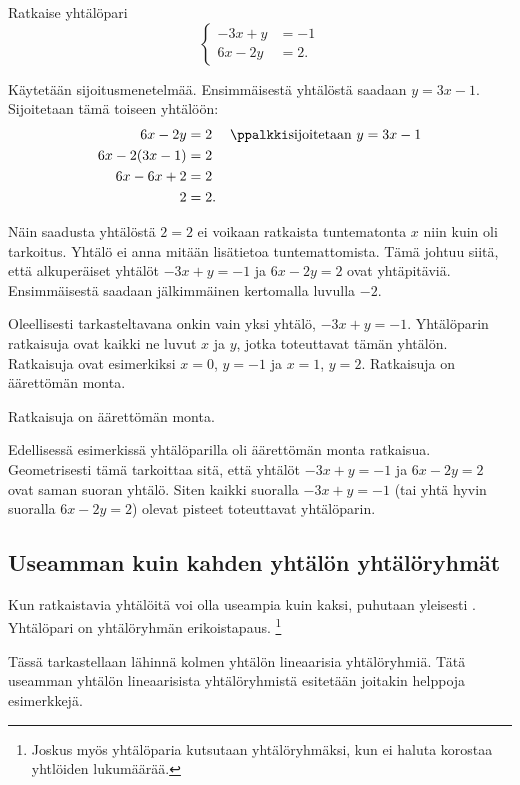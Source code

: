 \begin{esimerkki}
Ratkaise yhtälöpari
\[
\left\{
\begin{aligned}
-3x+y&= -1 \\
6x-2y&= 2.
\end{aligned}
\right.
\]
\begin{esimratk}
Käytetään sijoitusmenetelmää. Ensimmäisestä yhtälöstä saadaan $y=3x-1$. Sijoitetaan tämä toiseen yhtälöön:
\begin{align*}
6x-2y&= 2 && \ppalkki \text{sijoitetaan $y=3x-1$} \\
6x-2(3x-1)&= 2 && \\
6x-6x+2&= 2 && \\
2&= 2. &&
\end{align*}
\end{esimratk}
Näin saadusta yhtälöstä $2=2$ ei voikaan ratkaista tuntematonta $x$ niin kuin oli tarkoitus. Yhtälö ei anna mitään lisätietoa tuntemattomista. Tämä johtuu siitä, että alkuperäiset yhtälöt $-3x+y= -1$ ja $6x-2y= 2$ ovat yhtäpitäviä. Ensimmäisestä saadaan jälkimmäinen kertomalla luvulla $-2$.

Oleellisesti tarkasteltavana onkin vain yksi yhtälö, $-3x+y= -1$. Yhtälöparin ratkaisuja ovat kaikki ne luvut $x$ ja $y$, jotka toteuttavat tämän yhtälön. Ratkaisuja ovat esimerkiksi $x=0$, $y=-1$ ja $x=1$, $y=2$. Ratkaisuja on äärettömän monta.
\begin{esimvast}
Ratkaisuja on äärettömän monta.
\end{esimvast}
\end{esimerkki}

Edellisessä esimerkissä yhtälöparilla oli äärettömän monta ratkaisua. Geometrisesti tämä tarkoittaa sitä, että yhtälöt $-3x+y= -1$ ja $6x-2y= 2$ ovat saman suoran yhtälö. Siten kaikki suoralla $-3x+y= -1$ (tai yhtä hyvin suoralla $6x-2y= 2$) olevat pisteet toteuttavat yhtälöparin.



\subsection*{Useamman kuin kahden yhtälön yhtälöryhmät}

Kun ratkaistavia yhtälöitä voi olla useampia kuin kaksi, puhutaan yleisesti . Yhtälöpari on yhtälöryhmän erikoistapaus. \footnote{Joskus myös yhtälöparia kutsutaan yhtälöryhmäksi, kun ei haluta korostaa yhtlöiden lukumäärää.}

Tässä tarkastellaan lähinnä kolmen yhtälön lineaarisia yhtälöryhmiä. Tätä useamman yhtälön
lineaarisista yhtälöryhmistä esitetään joitakin helppoja esimerkkejä. 

